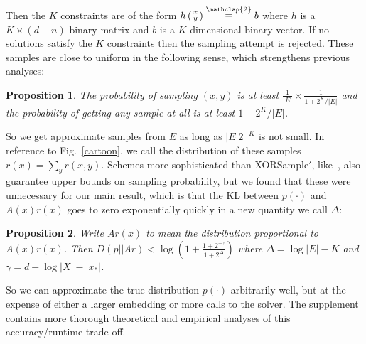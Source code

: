 \documentclass{article}
\newtheorem{proposition}{Proposition}
\newcommand\modt{\stackrel{\mathclap{\normalfont 2}}{\equiv}}
\begin{document}
  Then the $K$ constraints are of the form $h\left(\begin{smallmatrix}x\\y\end{smallmatrix}\right) \modt b$ where $h$ is a $K\times (d+n)$ binary matrix and $b$ is a $K$-dimensional binary vector.
  If no solutions satisfy the $K$ constraints then the sampling attempt is rejected.
  These samples are close to uniform in the following sense, which strengthens previous analyses: %
  \begin{proposition}\label{propositionLowerBound}
    The probability of sampling $(x,y)$ is at least $\frac{1}{|E|}\times \frac{1}{1 + 2^K/|E|}$ and the probability of getting any sample at all is at least $1 - 2^{K}/|E|$.
  \end{proposition}

  So we get approximate samples from $E$ as long as $|E|2^{-K}$ is not small.
  In reference to Fig.~\ref{cartoon},
  we call the distribution of these samples $r(x)=\sum_y r(x,y)$.
  Schemes more sophisticated than XORSample$'$, like~\cite{ermon2013embed}, also guarantee upper bounds on sampling probability, but we found that these were unnecessary for our main result, which is that the KL between $p(\cdot )$ and $A(x)r(x)$ goes to zero exponentially quickly in a new quantity we call $\Delta$:
  \begin{proposition}\label{mainResult}
    Write $Ar(x)$ to mean the distribution  proportional to $A(x)r(x)$. Then $D(p||Ar)<\log \left( 1 + \frac{1 + 2^{ - \gamma}}{1 + 2^\Delta}\right)$ where
    $\Delta = \log |E| - K$ and $\gamma = d - \log |X| - \lvert x_* \rvert $.
  \end{proposition}

  So we can approximate the true distribution $p(\cdot )$ arbitrarily well, but at the expense of either a larger embedding or more calls to the solver.
  The supplement contains more thorough theoretical and empirical analyses of this accuracy/runtime trade-off.
\end{document}
